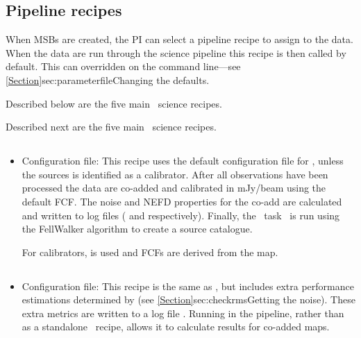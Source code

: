 \documentclass[11pt,oneside,chapters]{starlink}
\begin{document}
\subsection{Pipeline recipes}
\label{sec:recipes}

When MSBs are created, the PI can select a pipeline recipe to assign
to the data. When the data are run through the science pipeline this
recipe is then called by default. This can overridden on the command
line---see \cref{Section}{sec:parameterfile}{Changing the defaults}.
\begin{latexonly}
Described below are the five main \oracdr\ science recipes.
\end{latexonly}
\begin{htmlonly}
Described next are the five main \oracdr\ science recipes.
\end{htmlonly}

\subsection{}
\begin{itemize}
\item  Configuration file: 
\newline\newline
This recipe uses the default configuration file for \makemap, unless
the sources is identified as a calibrator. After all observations have
been processed the data are co-added and calibrated in mJy/beam using the
default FCF. The noise and NEFD properties for the co-add are calculated
and written to log files ( and 
respectively). Finally, the \cupid\ task \findclumps\ is run using the
FellWalker algorithm to create a source catalogue.

For calibrators,  is used and
FCFs are derived from the map.
\end{itemize}

\subsection{}
\begin{itemize}
\item  Configuration file: 
\newline\newline
This recipe is the same as , but includes extra
performance estimations determined by  (see
\cref{Section}{sec:checkrms}{Getting the noise}). These extra metrics
are written to a log file . Running 
in the pipeline, rather than as a standalone \picard\ recipe, allows it
to calculate results for co-added maps.
\end{itemize}
\end{document}
